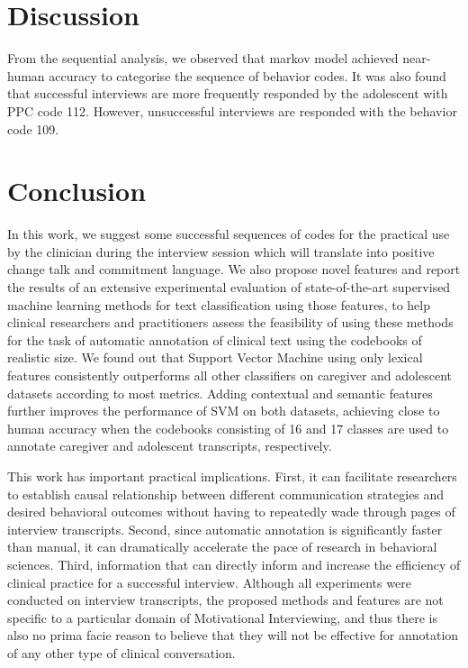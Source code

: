 \documentclass{amia}
\begin{document}
\section*{Discussion}
From the sequential analysis, we observed that markov model achieved near-human accuracy to categorise the sequence of behavior codes. It was also found that successful interviews are more frequently responded by the adolescent with PPC code 112. However, unsuccessful interviews are responded with the behavior code 109.

\section*{Conclusion}
In this work, we suggest some successful sequences of codes for the practical use by the clinician during the interview session which will translate into positive change talk and commitment language. We also propose novel features and report the results of an extensive experimental evaluation of state-of-the-art supervised machine learning methods for text classification using those features, to help clinical researchers and practitioners assess the feasibility of using these methods for the task of automatic annotation of clinical text using the codebooks of realistic size. We found out that Support Vector Machine using only lexical features consistently outperforms all other classifiers on caregiver and adolescent datasets according to most metrics. Adding contextual and semantic features further improves the performance of SVM on both datasets, achieving close to human accuracy when the codebooks consisting of 16 and 17 classes are used to annotate caregiver and adolescent transcripts, respectively.

This work has important practical implications. First, it can facilitate researchers to establish causal relationship between different communication strategies and desired behavioral outcomes without having to repeatedly wade through pages of interview transcripts. Second, since automatic annotation is significantly faster than manual, it can dramatically accelerate the pace of research in behavioral sciences. Third, information that can directly inform and increase the efficiency of clinical practice for a successful interview. Although all experiments were conducted on interview transcripts, the proposed methods and features are not specific to a particular domain of Motivational Interviewing, and thus there is also no prima facie reason to believe that they will not be effective for annotation of any other type of clinical conversation.
\end{document}
